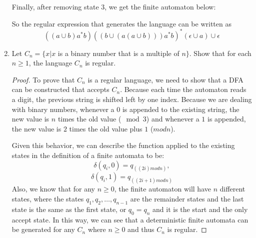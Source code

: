 \documentclass[11pt]{article}
\begin{document}
\begin{enumerate}
Finally, after removing state $3$, we get the finite automaton below:

\begin{center}
\end{center}

So the regular expression that generates the language can be written as 
$$ ((a \cup b)a^*b)((b \cup (a(a \cup b)))a^*b)^*(\epsilon \cup a) \cup \epsilon $$


\item
Let $C_n = \{x | x$ is a binary number that is a multiple of $n\}$. Show that for each $n \geq 1$, the language $C_n$ is regular.

\begin{proof}
To prove that $C_n$ is a regular language, we need to show that a DFA can be constructed that accepts $C_n$.  Because each time the automaton reads a digit, the previous string is shifted left by one index.  Because we are dealing with binary numbers, whenever a $0$ is appended to the existing string, the new value is $n$ times the old value ($\mod 3$) and whenever a $1$ is appended, the new value is $2$ times the old value plus $1$ ($mod n$).  

Given this behavior, we can describe the function applied to the existing states in the definition of a finite automata to be:
$$ \delta(q_i, 0) = q_{((2i)mod n)}, $$
$$ \delta(q_i, 1) = q_{((2i+1)mod n)} $$
Also, we know that for any $n \geq 0$, the finite automaton will have $n$ different states, where the states $q_1, q_2, \hdots, q_{n-1}$ are the remainder states and the last state is the same as the first state, or $q_0 = q_n$ and it is the start and the only accept state.  In this way, we can see that a deterministic finite automata can be generated for any $C_n$ where $n \geq 0$ and thus $C_n$ is regular.  
\end{proof}


\end{enumerate}
\end{document}
